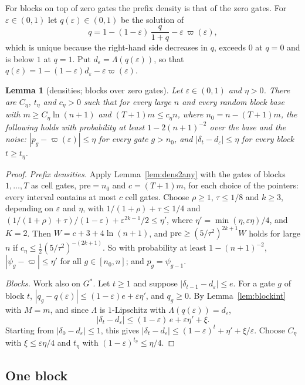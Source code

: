 \documentclass[11pt]{amsart}
\newtheorem{lemma}[theorem]{Lemma}
\theoremstyle{definition}
\theoremstyle{remark}
\newcommand{\eps}{\varepsilon}
\begin{document}
For blocks on top of zero gates the prefix density is that of the zero gates. For $\eps\in(0,1)$
let $q(\eps)\in(0,1)$ be the solution of
\begin{equation}\label{eq:qeps}
q=1-(1-\eps)\,\frac{q}{1+q}-\eps\,\varpi(\eps),
\end{equation}
which is unique because the right-hand side decreases in $q$, exceeds $0$ at $q=0$ and is below
$1$ at $q=1$. Put $d_\eps=\Lambda(q(\eps))$, so that $q(\eps)=1-(1-\eps)d_\eps-\eps\varpi(\eps)$.

\begin{lemma}[densities; blocks over zero gates]\label{lem:blockdens0}
Let $\eps\in(0,1)$ and $\eta>0$. There are $C_\eta$, $t_\eta$ and $c_\eta>0$ such that for every
large $n$ and every random block base with $m\ge C_\eta\ln(n+1)$ and $(T+1)m\le c_\eta n$, where
$n_0=n-(T+1)m$, the following holds with probability at least $1-2(n+1)^{-2}$ over the base and the
noise:
$|p_g-\varpi(\eps)|\le\eta$ for every gate $g>n_0$, and $|\delta_t-d_\eps|\le\eta$ for every block
$t\ge t_\eta$.
\end{lemma}

\begin{proof}
\emph{Prefix densities.} Apply Lemma~\ref{lem:dens2any} with the gates of blocks $1,\dots,T$ as
cell gates, $\mathrm{pre}=n_0$ and $c=(T+1)m$, for each choice of the pointers: every interval
contains at most $c$ cell gates.
Choose $\rho\ge1$, $\tau\le1/8$ and $k\ge3$, depending on $\eps$ and $\eta$, with $1/(1+\rho)+\tau\le1/4$ and
$(1/(1+\rho)+\tau)/(1-\eps)+\eps^{2k-1}/2\le\eta'$, where $\eta'=\min(\eta,\eps\eta)/4$, and
$K=2$. Then $W=c+3+4\ln(n+1)$, and $\mathrm{pre}\ge(5/\tau^2)^{2k+1}W$ holds for large $n$ if
$c_\eta\le\frac12(5/\tau^2)^{-(2k+1)}$. So with probability at least $1-(n+1)^{-2}$,
$|\psi_g-\varpi|\le\eta'$ for all $g\in[n_0,n]$; and $p_g=\psi_{g-1}$.

\emph{Blocks.} Work also on $G^*$. Let $t\ge1$ and suppose $|\delta_{t-1}-d_\eps|\le e$. For a gate
$g$ of block $t$, $|q_g-q(\eps)|\le(1-\eps)e+\eps\eta'$, and $q_g\ge0$. By Lemma~\ref{lem:blockint}
with $M=m$, and since $\Lambda$ is $1$-Lipschitz with $\Lambda(q(\eps))=d_\eps$,
\[
|\delta_t-d_\eps|\le(1-\eps)\,e+\eps\eta'+\xi .
\]
Starting from $|\delta_0-d_\eps|\le1$, this gives
$|\delta_t-d_\eps|\le(1-\eps)^t+\eta'+\xi/\eps$. Choose $C_\eta$ with $\xi\le\eps\eta/4$ and $t_\eta$
with $(1-\eps)^{t_\eta}\le\eta/4$.
\end{proof}

\subsection{One block}
\end{document}
